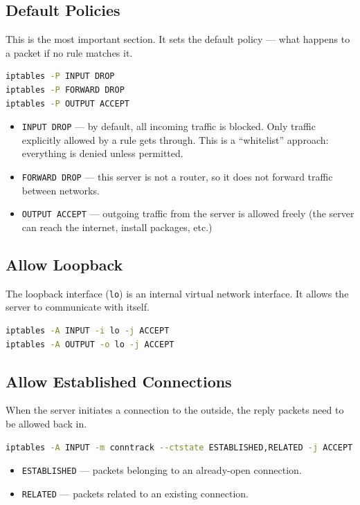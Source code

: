 \subsection{Default Policies}
This is the most important section. It sets the default policy — what happens to a packet if no rule matches it.
\begin{lstlisting}[language=bash]
iptables -P INPUT DROP
iptables -P FORWARD DROP
iptables -P OUTPUT ACCEPT
\end{lstlisting}
\begin{itemize}
    \item \texttt{INPUT DROP} — by default, all incoming traffic is blocked. Only traffic explicitly allowed by a rule gets through. This is a “whitelist” approach: everything is denied unless permitted.
    \item \texttt{FORWARD DROP} — this server is not a router, so it does not forward traffic between networks.
    \item \texttt{OUTPUT ACCEPT} — outgoing traffic from the server is allowed freely (the server can reach the internet, install packages, etc.)
\end{itemize}

\subsection{Allow Loopback}
The loopback interface (\texttt{lo}) is an internal virtual network interface. It allows the server to communicate with itself.
\begin{lstlisting}[language=bash]
iptables -A INPUT -i lo -j ACCEPT
iptables -A OUTPUT -o lo -j ACCEPT
\end{lstlisting}

\subsection{Allow Established Connections}
When the server initiates a connection to the outside, the reply packets need to be allowed back in.
\begin{lstlisting}[language=bash]
iptables -A INPUT -m conntrack --ctstate ESTABLISHED,RELATED -j ACCEPT
\end{lstlisting}
\begin{itemize}
    \item \texttt{ESTABLISHED} — packets belonging to an already-open connection.
    \item \texttt{RELATED} — packets related to an existing connection.
\end{itemize}

